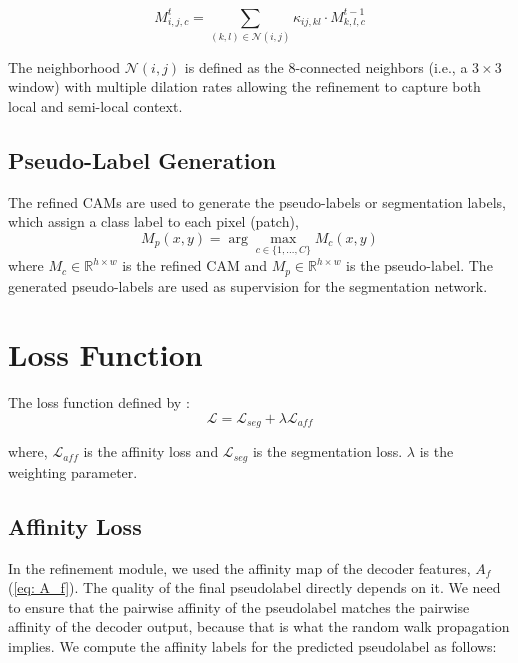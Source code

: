 \begin{equation}
    M^t_{i,j,c} = \sum_{(k, l) \in \mathcal{N}(i, j)} \kappa_{ij,kl} \cdot M^{t-1}_{k,l,c}
\end{equation}


The neighborhood \( \mathcal{N}(i, j) \) is defined as the 8-connected neighbors (i.e., a \(3\times{3}\) window) with multiple dilation rates  allowing the refinement to capture both local and semi-local context.

\subsection{Pseudo-Label Generation}
\label{subsec:pseudo_label_generation}
The refined CAMs are used to generate the pseudo-labels or segmentation labels, which assign a class label to each pixel (patch),
\begin{equation}
    M_p(x, y) = \arg\max_{c \in \{1, \ldots, C\}} M_c(x, y)
\end{equation}
where \( M_c \in \mathbb{R}^{h \times w} \) is the refined CAM and \( M_p \in \mathbb{R}^{h \times w} \) is the pseudo-label.
The generated pseudo-labels are used as supervision for the segmentation network.



\section{Loss Function}
\label{subsec:loss_func}

The loss function defined by \cite{wsss_frozen_clip}:
\begin{equation}
    \mathcal{L} = \mathcal{L}_{seg} + \lambda \mathcal{L}_{aff}
\end{equation}

where, $\mathcal{L}_{aff}$ is the affinity loss and $\mathcal{L}_{seg}$ is the segmentation loss. $\lambda$ is the weighting parameter.
\subsection{Affinity Loss}
\label{aff_loss}

In the refinement module, we used the affinity map of the decoder features, $A_f$ (\autoref{eq: A_f}). The quality of the final pseudolabel directly depends on it. We need to ensure that the pairwise affinity of the pseudolabel matches the pairwise affinity of the decoder output, because that is what the random walk propagation implies.
We compute the affinity labels for the predicted pseudolabel as follows:


